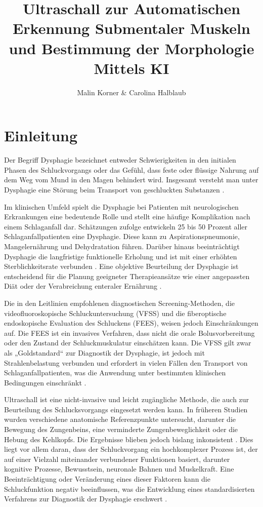 \documentclass[
	german,
	accentcolor=10c,%
	type=intern,
	marginpar=false
	]{tudapub}
\begin{document}
\title{Ultraschall zur Automatischen Erkennung Submentaler Muskeln und Bestimmung der Morphologie Mittels KI
}
\author{Malin Korner \& Carolina Halblaub}

\maketitle


\section{Einleitung}
Der Begriff Dysphagie bezeichnet entweder Schwierigkeiten in den initialen Phasen des Schluckvorgangs oder das Gefühl, dass feste oder flüssige Nahrung auf dem Weg vom Mund in den Magen behindert wird. Insgesamt versteht man unter Dysphagie eine Störung beim Transport von geschluckten Substanzen \cite{ref1}.

Im klinischen Umfeld spielt die Dysphagie bei Patienten mit neurologischen Erkrankungen eine bedeutende Rolle und stellt eine häufige Komplikation nach einem Schlaganfall dar. Schätzungen zufolge entwickeln 25 bis 50 Prozent aller Schlaganfallpatienten eine Dysphagie. Diese kann zu Aspirationspneumonie, Mangelernährung und Dehydratation führen. Darüber hinaus beeinträchtigt Dysphagie die langfristige funktionelle Erholung und ist mit einer erhöhten Sterblichkeitsrate verbunden \cite{ref2}. Eine objektive Beurteilung der Dysphagie ist entscheidend für die Planung geeigneter Therapieansätze wie einer angepassten Diät oder der Verabreichung enteraler Ernährung \cite{ref3}.

Die in den Leitlinien empfohlenen diagnostischen Screening-Methoden, die videofluoroskopische Schluckuntersuchung (VFSS) und die fiberoptische endoskopische Evaluation des Schluckens (FEES), weisen jedoch Einschränkungen auf. Die FEES ist ein invasives Verfahren, dass nicht die orale Bolusvorbereitung oder den Zustand der Schluckmuskulatur einschätzen kann. Die VFSS gilt zwar als „Goldstandard“ zur Diagnostik der Dysphagie, ist jedoch mit Strahlenbelastung verbunden und erfordert in vielen Fällen den Transport von Schlaganfallpatienten, was die Anwendung unter bestimmten klinischen Bedingungen einschränkt \cite{ref2,ref3}. 

Ultraschall ist eine nicht-invasive und leicht zugängliche Methode, die auch zur Beurteilung des Schlucksvorgangs eingesetzt werden kann. In früheren Studien wurden verschiedene anatomische Referenzpunkte untersucht, darunter die Bewegung des Zungenbeins, eine verminderte Zungenbeweglichkeit oder die Hebung des Kehlkopfs. Die Ergebnisse blieben jedoch bislang inkonsistent \cite{ref2}.
Dies liegt vor allem daran, dass der Schluckvorgang ein hochkomplexer Prozess ist, der auf einer Vielzahl miteinander verbundener Funktionen basiert, darunter kognitive Prozesse, Bewusstsein, neuronale Bahnen und Muskelkraft. Eine Beeinträchtigung oder Veränderung eines dieser Faktoren kann die Schluckfunktion negativ beeinflussen, was die Entwicklung eines standardisierten Verfahrens zur Diagnostik der Dysphagie erschwert \cite{ref2,ref3}.
\end{document}
